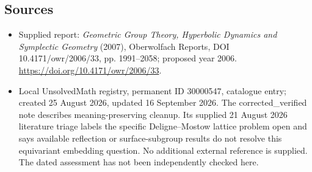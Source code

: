 \documentclass[11pt]{article}
\begin{document}
\subsection{Sources}
\begin{itemize}
\item Supplied report: \emph{Geometric Group Theory, Hyperbolic Dynamics and Symplectic Geometry} (2007), Oberwolfach Reports, DOI 10.4171/owr/2006/33, pp. 1991--2058; proposed year 2006. \url{https://doi.org/10.4171/owr/2006/33}.
\item Local UnsolvedMath registry, permanent ID 30000547, catalogue entry; created 25 August 2026, updated 16 September 2026. The corrected\_verified note describes meaning-preserving cleanup. Its supplied 21 August 2026 literature triage labels the specific Deligne--Mostow lattice problem open and says available reflection or surface-subgroup results do not resolve this equivariant embedding question. No additional external reference is supplied. The dated assessment has not been independently checked here.
\end{itemize}
\end{document}
